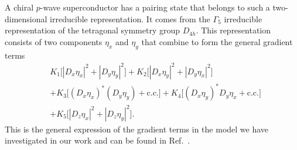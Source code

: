 A chiral $p$-wave superconductor has a pairing state that
belongs to such a two-dimensional irreducible representation. It comes from the $\Gamma_5$ irreducible representation of the
tetragonal symmetry group $D_{4h}$. This representation consists of two components $\eta_x$ and $\eta_y$ that combine
to form the general gradient terms
\begin{equation}
    \label{eq:statMech:gradTerms:chiralPWave}
    \begin{split}
        &K_1\big[|D_x\eta_x|^2 + |D_y\eta_y|^2\big] + K_2\big[|D_x\eta_y|^2 + |D_y\eta_x|^2\big]\\
        & + K_3\big[(D_x\eta_x)^\ast(D_y\eta_y) + \text{c.c.}\big] + K_4\big[(D_x\eta_y)^\ast D_y\eta_x + \text{c.c.}\big]\\
        & + K_5\big[|D_z\eta_x|^2 + |D_z\eta_y|^2\big].
    \end{split}
\end{equation}
This is the general expression of the gradient terms in the model we have investigated in our work and can be found in Ref.~\cite{SigristUeda91}.
